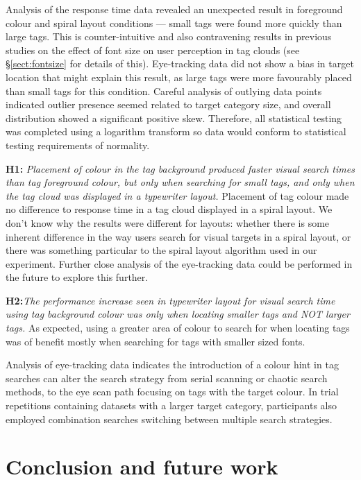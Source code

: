 Analysis of the response time data revealed an unexpected result in foreground colour and spiral layout conditions  ---  small tags were found more quickly than large tags. This is counter-intuitive and also contravening results in previous studies on the effect of font size on user perception in tag clouds (see \S\ref{sect:fontsize} for details of this). Eye-tracking data did not show a bias in target location that might explain this result, as large tags were more favourably placed than small tags for this condition. Careful analysis of outlying data points indicated outlier presence seemed related to target category size, and overall distribution showed a significant positive skew. Therefore, all statistical testing was completed using a logarithm transform so data would conform to statistical testing requirements of normality.

\textbf{H1:} \textit{Placement of colour in the tag background produced faster visual search times than tag foreground colour, but only when searching for small tags, and only when the tag cloud was displayed in a typewriter layout.}  Placement of tag colour made no difference to response time in a tag cloud displayed in a spiral layout. We don't know why the results were different for layouts: whether there is some inherent difference in the way users search for visual targets in a spiral layout, or there was something particular to the spiral layout algorithm used in our experiment. Further close analysis of the eye-tracking data could be performed in the future to explore this further.

\textbf{H2:}\textit{The performance increase seen in typewriter layout for visual search time using tag background colour was only when locating smaller tags and NOT larger tags.} As expected, using a greater area of colour to search for when locating tags was of benefit mostly when searching for tags with smaller sized fonts.

Analysis of eye-tracking data indicates the introduction of a colour hint in tag searches can alter the search strategy from serial scanning or chaotic search methods, to the eye scan path focusing on tags with the target colour. In trial repetitions containing datasets with a larger target category, participants also employed combination searches switching between multiple search strategies.

\section{Conclusion and future work}\label{sect:exp1conclusions}

